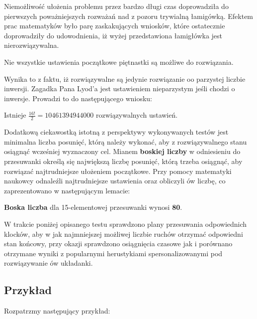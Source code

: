         Niemożliwość ułożenia problemu przez bardzo długi czas doprowadziła do pierwszych poważniejszych rozważań 
        nad z pozoru trywialną łamigówką. Efektem prac matematyków było parę zaskakujących wniosków, które ostatecznie doprowadziły 
        do udowodnienia, iż wyżej przedstawiona łamigłówka jest nierozwiązywalna.

        \begin{lemma}
            Nie wszystkie ustawienia początkowe piętnastki są możliwe do rozwiązania.\cite{Fifteen}
        \end{lemma}
        
        Wynika to z faktu, iż rozwiązywalne są jedynie rozwiązanie oo parzystej liczbie inwersji. Zagadka Pana Lyod'a jest 
        ustawieniem nieparzystym jeśli chodzi o inwersje. Prowadzi to do następującego wniosku:
        \begin{corollary}
            Istnieje $\frac{16!}{2}=10 461 394 944 000$ rozwiązywalnych ustawień. 
        \end{corollary}

        Dodatkową ciekawostką istotną z perspektywy wykonywanych testów jest minimalna liczba posunięć, którą należy wykonać, 
        aby z rozwiązywalnego stanu osiągnąć wcześniej wyznaczony cel. Mianem \textbf{boskiej liczby} w odniesieniu do przesuwanki
        określą się największą liczbę posunięć, którą trzeba osiągnąć, aby rozwiązać najtrudniejsze ułożeniem początkowe. Przy pomocy matematyki 
        naukowcy odnaleźli najtrudniejsze ustawienia oraz obliczyli ów liczbę, co zaprezentowano w następującym lemacie:

        \begin{lemma}
            \textbf{Boska liczba} dla 15-elementowej przesuwanki wynosi \textbf{80}. \cite{80Moves}
        \end{lemma}

        W trakcie poniżej opisanego testu sprawdzono plany przesuwania odpowiednich klocków, aby w jak najmniejszej możliwej liczbie ruchów
        otrzymać odpowiedni stan końcowy, przy okazji sprawdzono osiągnięcia czasowe jak i porównano otrzymane wyniki z popularnymi herustykiami 
        spersonalizowanymi pod rozwiązywanie ów układanki.

    \subsection{Przykład}
        Rozpatrzmy następujący przykład:


